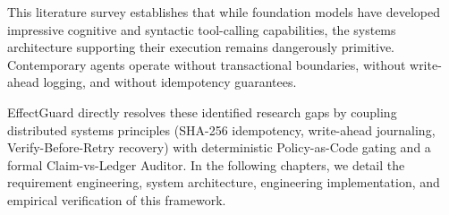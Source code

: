 This literature survey establishes that while foundation models have developed impressive cognitive and syntactic tool-calling capabilities, the systems architecture supporting their execution remains dangerously primitive. Contemporary agents operate without transactional boundaries, without write-ahead logging, and without idempotency guarantees. 

EffectGuard directly resolves these identified research gaps by coupling distributed systems principles (SHA-256 idempotency, write-ahead journaling, Verify-Before-Retry recovery) with deterministic Policy-as-Code gating and a formal Claim-vs-Ledger Auditor. In the following chapters, we detail the requirement engineering, system architecture, engineering implementation, and empirical verification of this framework.
